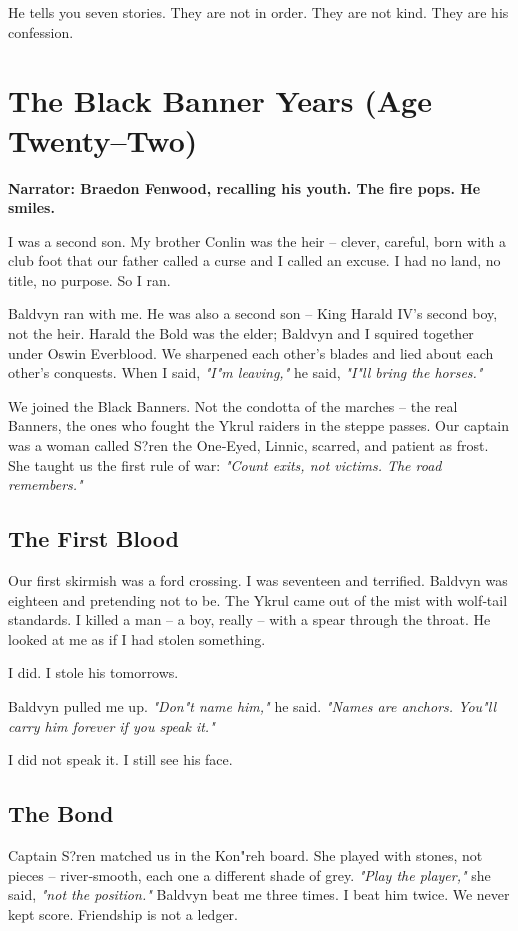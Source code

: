 \documentclass[11pt]{book}
\begin{document}
\vspace{1em}
\noindent He tells you seven stories. They are not in order. They are not kind. They are his confession.

\clearpage

\chapter{The Black Banner Years (Age Twenty--Two)}

\textbf{Narrator: Braedon Fenwood, recalling his youth. The fire pops. He smiles.}

\lettrine{I}{} was a second son. My brother Conlin was the heir -- clever, careful, born with a club foot that our father called a curse and I called an excuse. I had no land, no title, no purpose. So I ran.

Baldvyn ran with me. He was also a second son -- King Harald IV's second boy, not the heir. Harald the Bold was the elder; Baldvyn and I squired together under Oswin Everblood. We sharpened each other's blades and lied about each other's conquests. When I said, \textit{"I"m leaving,"} he said, \textit{"I"ll bring the horses."}

We joined the Black Banners. Not the condotta of the marches -- the real Banners, the ones who fought the Ykrul raiders in the steppe passes. Our captain was a woman called S?ren the One‑Eyed, Linnic, scarred, and patient as frost. She taught us the first rule of war: \textit{"Count exits, not victims. The road remembers."}

\section*{The First Blood}
Our first skirmish was a ford crossing. I was seventeen and terrified. Baldvyn was eighteen and pretending not to be. The Ykrul came out of the mist with wolf‑tail standards. I killed a man -- a boy, really -- with a spear through the throat. He looked at me as if I had stolen something.

I did. I stole his tomorrows.

Baldvyn pulled me up. \textit{"Don"t name him,"} he said. \textit{"Names are anchors. You"ll carry him forever if you speak it."}

I did not speak it. I still see his face.

\section*{The Bond}
Captain S?ren matched us in the Kon"reh board. She played with stones, not pieces -- river‑smooth, each one a different shade of grey. \textit{"Play the player,"} she said, \textit{"not the position."} Baldvyn beat me three times. I beat him twice. We never kept score. Friendship is not a ledger.
\end{document}
